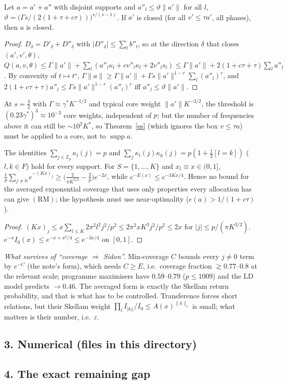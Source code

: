 \documentclass[11pt]{article}
\theoremstyle{remark}\newtheorem{remark}[theorem]{Remark}
\begin{document}
\begin{lemma}\label{thin}
Let $a=a'+a''$ with disjoint supports and $a''_l\le\vartheta\|a'\|$ for all $l$, $\vartheta=\big(\Gamma s/(2(1+\tau+c\tau))\big)^{s/(s-1)}$.  If $a'$ is closed
(for all $v'\le\tau a'$, all phases), then $a$ is closed.
\end{lemma}
\begin{proof}
$D_\delta=D'_\delta+D''_\delta$ with $|D''_\delta|\le\sum_lb''_l$, so at the direction $\delta$ that closes $(a',v',\theta)$,
$Q(a,v,\theta)\le\Gamma\|a'\|+\sum_l(a''_l\kappa_l+cv''_l\kappa_l+2v''_ls_l)\le\Gamma\|a'\|+2(1+c\tau+\tau)\sum_la''_l$.  By convexity of $t\mapsto t^s$,
$\Gamma\|a\|\ge\Gamma\|a'\|+\Gamma s\|a'\|^{1-r}\sum_l(a''_l)^r$, and $2(1+c\tau+\tau)a''_l\le\Gamma s\|a'\|^{1-r}(a''_l)^r$ iff $a''_l\le\vartheta\|a'\|$.
\end{proof}
At $s=\frac32$ with $\Gamma\approx\gamma^\ast K^{-1/2}$ and typical core weight $\|a'\|K^{-3/2}$, the threshold is $(0.23\gamma^\ast)^3\approx10^{-3}$ core weights, independent of
$p$; but the number of frequencies above it can still be $\sim10^2K^\ast$, so Theorem~\ref{es} (which ignores the box $v\le\tau a$) must be applied to
a core, not to $\operatorname{supp}a$.

\begin{proposition}\label{noUniv}
The identities $\sum_{j\in\mathbb Z_p}\kappa_l(j)=p$ and $\sum_j\kappa_l(j)\kappa_k(j)=p(1+\frac12[l=k])$ ($l,k\in F$) hold for every support.  For $S=\{1,\dots,K\}$ and $x_l\equiv x\in(0,1]$,
$\frac1p\sum_{j\ne0}e^{-(Kx)_j}\ge\big(\frac2{\pi K^{3/2}}-\frac2p\big)e^{-2x}$, while $e^{-E(x)}\le e^{-3Kx/4}$.  Hence no bound for the averaged exponential coverage that uses only
properties every allocation has can give $(\mathrm{RM})$; the hypothesis must use near-optimality ($e(a)>1/(1+c\tau)$).
\end{proposition}
\begin{proof}
$(Kx)_j\le x\sum_{l\le K}2\pi^2l^2j^2/p^2\le2\pi^2xK^3j^2/p^2\le2x$ for $|j|\le p/(\pi K^{3/2})$.  $e^{-x}I_0(x)\le e^{-x+x^2/4}\le e^{-3x/4}$ on $[0,1]$.
\end{proof}
\emph{What survives of ``coverage $\Rightarrow$ Sidon''.}  Min-coverage $C$ bounds every $j\ne0$ term by $e^{-C}$ (the note's form), which needs $C\ge E$, i.e.\ coverage
fraction $\gtrsim0.77$--$0.8$ at the relevant scale; programme maximisers have $0.59$--$0.79$ ($p\le1009$) and the LD model predicts $\to0.46$.  The averaged
form is exactly the Skellam return probability, and that is what has to be controlled.  Transference forces short relations, but their Skellam weight
$\prod_lI_{|k_l|}/I_0\le A(x)^{\|k\|_1}$ is small; what matters is their number, i.e.\ $\varepsilon$.

\subsection*{3. Numerical (files in this directory)}


\subsection*{4. The exact remaining gap}

\end{document}
